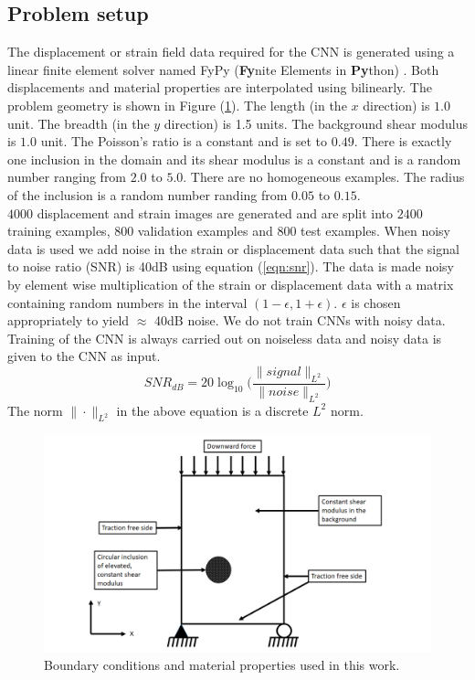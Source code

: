 \documentclass[12pt]{article}
\begin{document}
\subsection{\label{sect:probsetup}Problem setup}
The displacement or strain field data required for the CNN is generated using a linear finite element solver named FyPy (\textbf{Fy}nite Elements in \textbf{Py}thon) \cite{misc:fypy}. Both displacements and material properties are interpolated using bilinearly. The problem geometry is shown in Figure (\ref{fig:bc}). The length (in the $x$ direction) is $1.0$ unit. The breadth (in the $y$ direction) is 1.5 units. The background shear modulus is $1.0$ unit. The Poisson's ratio is a constant and is set to $0.49$. There is exactly one inclusion in the domain and its shear modulus is a constant and is a random number ranging from $2.0$ to $5.0$. There are no homogeneous examples. The radius of the inclusion is a random number randing from $0.05$ to $0.15$.\\
$4000$ displacement and strain images are generated and are split into $2400$ training examples, $800$ validation examples and $800$ test examples. When noisy data is used we add noise in the strain or displacement data such that the signal to noise ratio (SNR) is 40dB using equation (\ref{eqn:snr}). The data is made noisy by element wise multiplication of the strain or displacement data with a matrix containing random numbers in the interval $(1-\epsilon,1+\epsilon)$. $\epsilon$ is chosen appropriately to yield $\approx$ 40dB noise. We do not train CNNs with noisy data. Training of the CNN is always carried out on noiseless data and noisy data is given to the CNN as input. 
\begin{equation}
  \label{eqn:snr}
  SNR_{dB} = 20\log_{10}\Big(\frac{\|signal\|_{L^2}}{\|noise\|_{L^2}}\Big)
\end{equation}
The norm $\|\cdot\|_{L^2}$ in the above equation is a discrete $L^2$ norm. 
%
\begin{figure}[h] 
   \centering
    \includegraphics[totalheight=9cm]{Figures/bc.png}
  \caption{\label{fig:bc}Boundary conditions and material properties used in this work. }
\end{figure}
%
\end{document}

